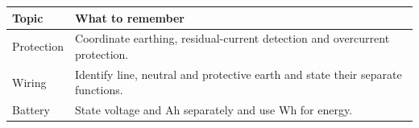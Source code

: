 \documentclass[12pt,a4paper]{article}
\begin{document}
\begin{tcolorbox}[tikzbox, title={Summary Reference}]
\begin{tabularx}{\linewidth}{|B{4.0cm}|Y|}\hline
Topic & \textbf{What to remember} \\ \hline
Protection & Coordinate earthing, residual-current detection and overcurrent protection. \\ \hline
Wiring & Identify line, neutral and protective earth and state their separate functions. \\ \hline
Battery & State voltage and Ah separately and use Wh for energy. \\ \hline
\end{tabularx}
\end{tcolorbox}
\end{document}
